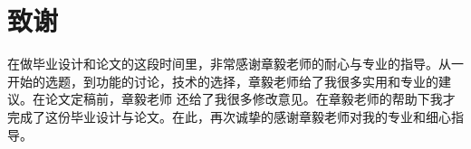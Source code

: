 
\chapter{致谢}
在做毕业设计和论文的这段时间里，非常感谢章毅老师的耐心与专业的指导。从一开始的选题，到功能的讨论，技术的选择，章毅老师给了我很多实用和专业的建议。在论文定稿前，章毅老师
还给了我很多修改意见。在章毅老师的帮助下我才完成了这份毕业设计与论文。在此，再次诚挚的感谢章毅老师对我的专业和细心指导。
